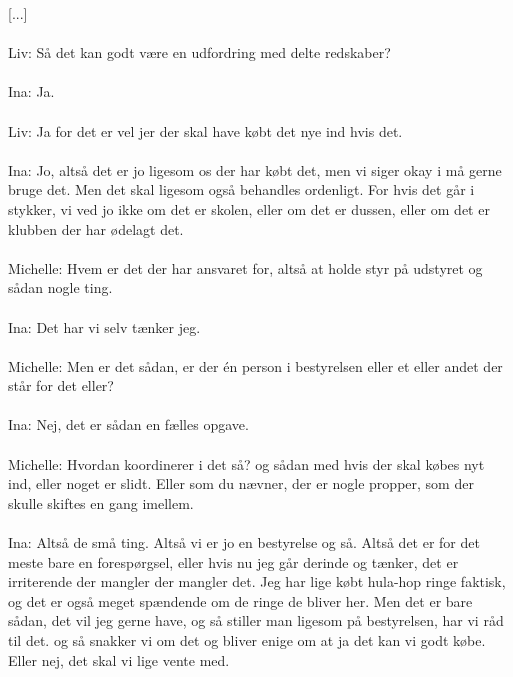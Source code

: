 [...]
\\\\
[6:41]
Liv: Så det kan godt være en udfordring med delte redskaber?
\\\\
Ina: Ja.
\\\\
Liv: Ja for det er vel jer der skal have købt det nye ind hvis det.
\\\\
Ina: Jo, altså det er jo ligesom os der har købt det, men vi siger okay i må gerne bruge det. Men det skal ligesom også behandles ordenligt. For hvis det går i stykker, vi ved jo ikke om det er skolen, eller om det er dussen, eller om det er klubben der har ødelagt det. 
\\\\
[7:06]
Michelle: Hvem er det der har ansvaret for, altså at holde styr på udstyret og sådan nogle ting. 
\\\\
Ina: Det har vi selv tænker jeg.
\\\\
Michelle: Men er det sådan, er der én person i bestyrelsen eller et eller andet der står for det eller?
\\\\
Ina: Nej, det er sådan en fælles opgave. 
\\\\
Michelle: Hvordan koordinerer i det så? og sådan med hvis der skal købes nyt ind, eller noget er slidt. Eller som du nævner, der er nogle propper, som der skulle skiftes en gang imellem.
\\\\
Ina: Altså de små ting. Altså vi er jo en bestyrelse og så. Altså det er for det meste bare en forespørgsel, eller hvis nu jeg går derinde og tænker, det er irriterende der mangler der mangler det. Jeg har lige købt hula-hop ringe faktisk, og det er også meget spændende om de ringe de bliver her. Men det er bare sådan, det vil jeg gerne have, og så stiller man ligesom på bestyrelsen, har vi råd til det. og så snakker vi om det og bliver enige om at ja det kan vi godt købe. Eller nej, det skal vi lige vente med. 
\\\\
[...]

